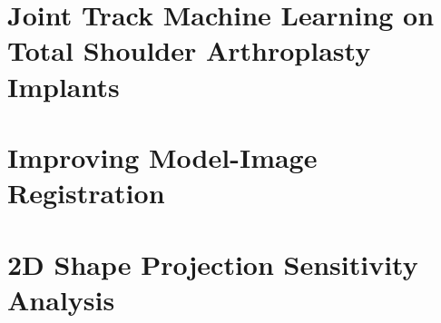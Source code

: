 \section{Joint Track Machine Learning on Total Shoulder Arthroplasty Implants}

\section{Improving Model-Image Registration}
\label{sec:new-image-metrics}

\section{2D Shape Projection Sensitivity Analysis}
\label{sec:shape-sensitivity}



